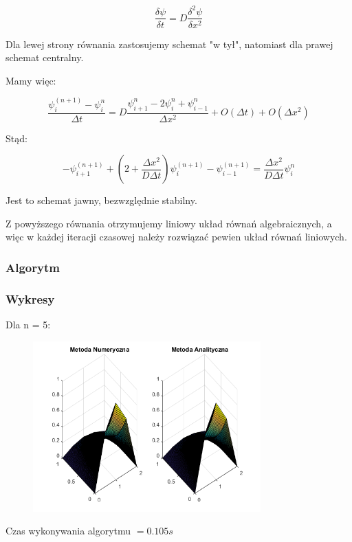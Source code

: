 $$\dfrac{\delta \psi}{\delta t} = D\dfrac{\delta^2 \psi}{\delta x^2}$$

Dla lewej strony równania zastosujemy schemat "w tył", natomiast dla prawej schemat centralny.

Mamy więc:

$$\dfrac{\psi^{(n+1)}_{i}-\psi^n_{i}}{\Delta t}=D\dfrac{\psi^{n}_{i+1}-2\psi^n_{i}+\psi^n_{i-1}}{\Delta x^2} + O(\Delta t)+O(\Delta x^2)$$

Stąd:

$$-\psi^{(n+1)}_{i+1} + \left(2+\dfrac{\Delta x^2}{D \Delta t}\right) \psi^{(n+1)}_{i} -\psi^{(n+1)}_{i-1} =\dfrac{\Delta x^2}{D\Delta t}\psi^{n}_{i}$$

Jest to schemat jawny, bezwzględnie stabilny. 

Z powyższego równania otrzymujemy liniowy układ równań algebraicznych, a więc w każdej iteracji czasowej należy rozwiązać pewien układ równań liniowych.
\newpage
\subsubsection{Algorytm}

\newpage
\subsubsection{Wykresy}

Dla n = 5:

\begin{figure}[!ht]
	\begin{center}
		\includegraphics[width=0.78\textwidth]{Lab7/charts/btcs/5.png}
	\end{center}
\end{figure}

Czas wykonywania algorytmu $ = 0.105 s$

